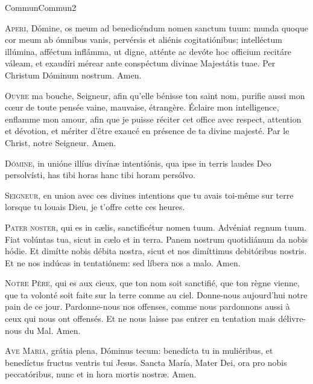 \documentclass[nocturnal_bvm_fr.tex]{subfiles}
\begin{document}
	{Commun}{Commun}{2}{}{}{}{}{}{}
\thispagestyle{empty}



\begin{paracol}{2}
\lettrine{A}{peri}, Dómine, os meum ad benedicéndum nomen sanctum tuum: munda quoque cor meum ab ómnibus vanis, pervérsis et aliénis 
cogitatiónibus; intelléctum illúmina, afféctum inflámma, ut digne, atténte ac devóte hoc officium recitáre váleam, et exaudíri mérear
ante conspéctum divinae Majestátis tuae. Per Christum Dóminum nostrum. Amen.

\switchcolumn

\lettrine{O}{uvre} ma bouche, Seigneur, afin qu’elle bénisse ton saint nom, purifie aussi mon cœur de toute pensée
vaine, mauvaise, étrangère. Éclaire mon intelligence, enflamme mon amour,
afin que je puisse réciter cet office avec respect, attention et dévotion, et mériter d’être exaucé en
présence de ta divine majesté. Par le Christ, notre Seigneur. Amen.

\switchcolumn*

\lettrine{D}{ómine}, in unióne illíus divínæ intentiónis, qua ipse in terris laudes Deo persolvísti, has tibi horas  hanc tibi horam\rubric{)} persólvo.

\switchcolumn

\lettrine{S}{eigneur}, en union avec ces divines intentions que tu avais toi-même sur terre lorsque
tu louais Dieu, je t’offre cette \rubric{(}ces\rubric{)} heure\rubric{(}s\rubric{)}.

\switchcolumn*

\lettrine{P}{ater noster}, qui es in cælis, sanctificétur nomen tuum. Advéniat regnum tuum. Fiat volúntas tua, sicut in cælo et in terra.
Panem nostrum quotidiánum da nobis hódie. Et dimítte nobis débita nostra, sicut et nos dimíttimus debitóribus nostris. Et ne nos
indúcas in tentatiónem: sed líbera nos a malo. Amen.

\switchcolumn

\lettrine{N}{otre Père}, qui es aux cieux, que ton nom soit sanctifié, que ton règne vienne,
que ta volonté soit faite sur la terre comme au ciel.
Donne-nous aujourd’hui notre pain de ce jour. Pardonne-nous nos offenses, comme nous pardonnons aussi à ceux qui nous ont offensés.
Et ne nous laisse pas entrer en tentation mais délivre-nous du Mal. Amen.

\switchcolumn*

\lettrine{A}{ve Maria}, grátia plena, Dóminus tecum: benedícta tu in muliéribus, 
et benedíctus fructus ventris tui Jesus. Sancta María, Mater Dei, ora pro nobis 
peccatóribus, nunc et in hora mortis nostræ. Amen.


\end{paracol}
\end{document}
